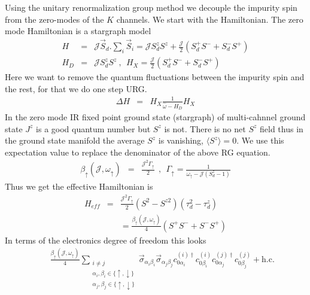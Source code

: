\documentclass[reprint,prb,superscriptaddress]{revtex4-2}
\begin{document}
\noindent Using the unitary renormalization group method we decouple the impurity spin from the zero-modes of the $K$ channels. We start with the Hamiltonian. The zero mode Hamiltonian is a stargraph model 
\begin{eqnarray}
H &=& {\mathcal{J}} \vec{S}_d.\displaystyle\sum_i \vec{S}_i ={\mathcal{J}} S_d^zS^z + \frac{{\mathcal{J}}}{2} (S_d^+S^-+ S_d^-S^+) \nonumber\\
H_D &=& {\mathcal{J}} S^z_d S^z~,~~ H_X = \frac{{\mathcal{J}}}{2} (S_d^+S^-+ S_d^-S^+)
\end{eqnarray}
Here we want to remove the quantum fluctuations between the impurity spin and the rest, for that we do one step URG.
\begin{eqnarray}
\Delta H &=& H_X \frac{1}{\hat{\omega}-H_D} H_X 
\end{eqnarray}
In the zero mode IR fixed point ground state (stargraph) of multi-cahnnel ground state $J^z$ is a good quantum number but $S^z$ is not. There is no net $S^z$ field thus in the ground state manifold the average $S^z$ is vanishing, $\langle S^z \rangle=0$. We use this expectation value to replace the denominator of the above RG equation.
\begin{eqnarray}
\beta_{\uparrow} ({\mathcal{J}},\omega_{\uparrow})&=& \frac{{\mathcal{J}}^2 \Gamma_{\uparrow}}{2} ~~,~~\Gamma_{\uparrow}=\frac{1}{\omega_{\uparrow}-{\mathcal{J}}(S_d^z-1)}
\end{eqnarray}
Thus we get the effective Hamiltonian is 
\begin{eqnarray}
H_{eff} &=& \frac{{\mathcal{J}}^2 \Gamma_{\uparrow}}{2} (S^2-S^{z2})(\tau^2_{d}-\tau^z_d)  \nonumber\\
&& =\frac{\beta_{\uparrow}({\mathcal{J}},\omega_{\uparrow})}{4} (S^+S^-+S^-S^+)   
\end{eqnarray}
In terms of the electronics degree of freedom this looks 
\begin{eqnarray}
&& \frac{ \beta_{\uparrow}({\mathcal{J}},\omega_{\uparrow}) }{4}   \displaystyle\sum_{\substack{i\neq j \\ \alpha_i,\beta_i\in \{\uparrow,\downarrow\}\\ \alpha_j,\beta_j\in \{\uparrow,\downarrow\}}}\vec{\sigma}_{\alpha_i\beta_i}\vec{\sigma}_{\alpha_j\beta_j}  c_{0\alpha_i}^{(i)\dagger}  c_{0\beta_i}^{(i)}    c_{0\alpha_j}^{(j)\dagger}  c_{0\beta_j}^{(j)} +\textrm{h.c.}   \nonumber
\label{eq:all-to-all_1}
\end{eqnarray}
\end{document}
